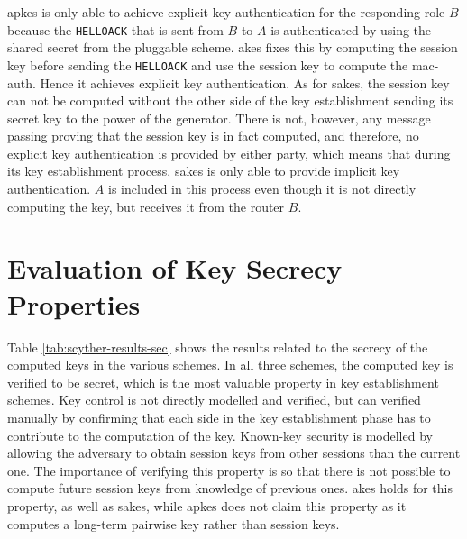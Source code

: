\gls{apkes} is only able to achieve explicit key authentication for the responding role $B$ because the \texttt{HELLOACK} that is sent from $B$ to $A$ is authenticated by using the shared secret from the pluggable scheme. \gls{akes} fixes this by computing the session key before sending the \texttt{HELLOACK} and use the session key to compute the \gls{mac-auth}. Hence it achieves explicit key authentication. As for \gls{sakes}, the session key can not be computed without the other side of the key establishment sending its secret key to the power of the generator. There is not, however, any message passing proving that the session key is in fact computed, and therefore, no explicit key authentication is provided by either party, which means that during its key establishment process, \gls{sakes} is only able to provide implicit key authentication. $A$ is included in this process even though it is not directly computing the key, but receives it from the router $B$.

\section{Evaluation of Key Secrecy Properties}

Table \ref{tab:scyther-results-sec} shows the results related to the secrecy of the computed keys in the various schemes. In all three schemes, the computed key is verified to be secret, which is the most valuable property in key establishment schemes. Key control is not directly modelled and verified, but can verified manually by confirming that each side in the key establishment phase has to contribute to the computation of the key. Known-key security is modelled by allowing the adversary to obtain session keys from other sessions than the current one. The importance of verifying this property is so that there is not possible to compute future session keys from knowledge of previous ones. \gls{akes} holds for this property, as well as \gls{sakes}, while \gls{apkes} does not claim this property as it computes a long-term pairwise key rather than session keys.

\begin{table}[h]
\centering
{}
\caption{Table of the security properties for secrecy that are satisfied in the different protocols.}
\label{tab:scyther-results-sec}
\end{table}

